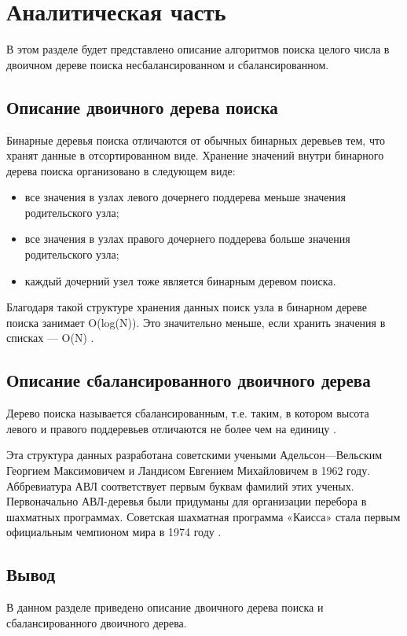 \chapter{Аналитическая часть}
В этом разделе будет представлено описание алгоритмов поиска целого числа в двоичном дереве поиска несбалансированном и сбалансированном.

\section{Описание двоичного дерева поиска}

Бинарные деревья поиска отличаются от обычных бинарных деревьев тем, что хранят данные в отсортированном виде.
Хранение значений внутри бинарного дерева поиска организовано в следующем виде:
\begin{itemize}[label=---]
	\item все значения в узлах левого дочернего поддерева меньше значения родительского узла;
	\item все значения в узлах правого дочернего поддерева больше значения родительского узла;
	\item каждый дочерний узел тоже является бинарным деревом поиска.
\end{itemize}

Благодаря такой структуре хранения данных поиск узла в бинарном дереве поиска занимает O(log(N)).
Это значительно меньше, если хранить значения в списках — O(N) \cite{bib0}.

\section{Описание сбалансированного двоичного дерева}

Дерево поиска называется сбалансированным, т.е. таким, в котором высота левого и правого поддеревьев отличаются не более чем на единицу \cite{bib1}.

Эта структура данных разработана советскими учеными Адельсон---Вельским Георгием Максимовичем и Ландисом Евгением Михайловичем в 1962 году. 
Аббревиатура АВЛ соответствует первым буквам фамилий этих ученых. 
Первоначально АВЛ-деревья были придуманы для организации перебора в шахматных программах. Советская шахматная программа «Каисса» стала первым официальным чемпионом мира в 1974 году \cite{bib0}.

\section*{Вывод}
В данном разделе приведено описание двоичного дерева поиска и сбалансированного двоичного дерева.
